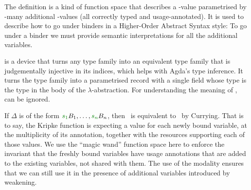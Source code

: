 
The definition
\AgdaSpace{}\AgdaBound{$\V$}\AgdaSpace{}\AgdaBound{$\C$}%
\AgdaSpace{}\AgdaBound{$\Delta$} is a kind
of function space that describes a \AgdaBound{$\C$}-value parametrised by
\AgdaBound{$\Delta$}-many additional \AgdaBound{$\V$}-values (all correctly
typed and usage-annotated).
It is used to describe how to go under binders in a
Higher-Order Abstract Syntax style: To go under a binder we must
provide semantic interpretations for all the additional variables.






is a device that turns any type family into an equivalent type family
that is judgementally injective in its indices, which helps with
Agda's type inference.
It turns the type family into a parametrised
record with a single field  whose type is the type in
the body of the $\lambda$-abstraction.
For understanding the meaning of
,  can be ignored.

If $\Delta$ is of the form $\gr{s_1}B_1, \ldots, \gr{s_n}B_n$, then
\ is equivalent to
\ by Currying.  That is
to say, the Kripke function is expecting a value for each newly bound
variable, at the multiplicity of its annotation, together with the
resources supporting each of those values. We use the ``magic wand''
function space here to enforce the invariant that the freshly bound
variables have usage annotations that are added to the existing
variables, not shared with them. The use of the
 modality ensures that we can still use it in
the presence of additional variables introduced by weakening.

